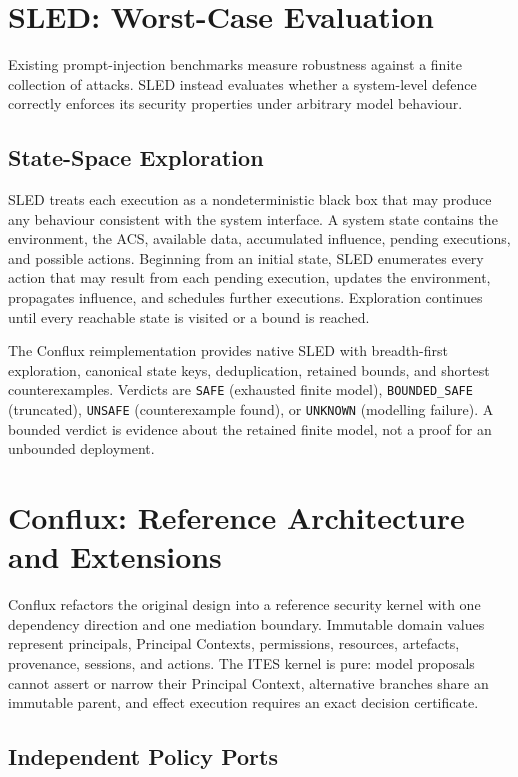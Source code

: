 \documentclass[11pt]{article}
\begin{document}
\section{SLED: Worst-Case Evaluation}
\label{sec:sled}

Existing prompt-injection benchmarks measure robustness against a finite
collection of attacks. SLED instead evaluates whether a system-level
defence correctly enforces its security properties under arbitrary model
behaviour.

\subsection{State-Space Exploration}

SLED treats each execution as a nondeterministic black box that may produce
any behaviour consistent with the system interface. A system state contains
the environment, the ACS, available data, accumulated influence, pending
executions, and possible actions. Beginning from an initial state, SLED
enumerates every action that may result from each pending execution,
updates the environment, propagates influence, and schedules further
executions. Exploration continues until every reachable state is visited
or a bound is reached.

The Conflux reimplementation provides native SLED with breadth-first
exploration, canonical state keys, deduplication, retained bounds, and
shortest counterexamples. Verdicts are \texttt{SAFE} (exhausted finite
model), \texttt{BOUNDED\_SAFE} (truncated), \texttt{UNSAFE}
(counterexample found), or \texttt{UNKNOWN} (modelling failure). A bounded
verdict is evidence about the retained finite model, not a proof for an
unbounded deployment.


\section{Conflux: Reference Architecture and Extensions}
\label{sec:conflux}

Conflux refactors the original design into a reference security kernel
with one dependency direction and one mediation boundary. Immutable domain
values represent principals, Principal Contexts, permissions, resources,
artefacts, provenance, sessions, and actions. The ITES kernel is pure:
model proposals cannot assert or narrow their Principal Context,
alternative branches share an immutable parent, and effect execution
requires an exact decision certificate.

\subsection{Independent Policy Ports}
\end{document}
